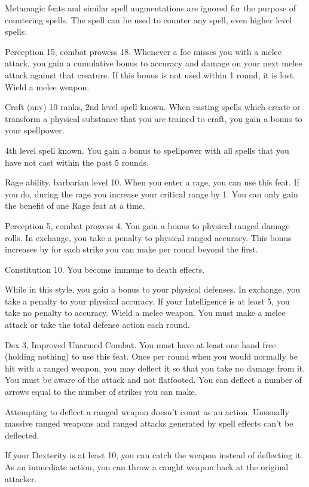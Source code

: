 Metamagic feats and similar spell augmentations are ignored for the purpose of countering spells.
The  spell can be used to counter any spell, even higher level spells.

\featpres Perception 15, combat prowess 18.
\featben Whenever a foe misses you with a melee attack, you gain a cumulative  bonus to accuracy and damage on your next melee attack against that creature.
If this bonus is not used within 1 round, it is lost.
\stylereq Wield a melee weapon.

\featpres Craft (any) 10 ranks, 2nd level spell known.
\featben When casting spells which create or transform a physical substance that you are trained to craft, you gain a  bonus to your spellpower.

\featpre 4th level spell known.
\featben You gain a  bonus to spellpower with all spells that you have not cast within the past 5 rounds.

\featpre Rage ability, barbarian level 10.
\featben When you enter a rage, you can use this feat. If you do, during the rage you increase your critical range by 1.
 You can only gain the benefit of one Rage feat at a time.

\featpres Perception 5, combat prowess 4.
\featben You gain a  bonus to physical ranged damage rolls.
In exchange, you take a  penalty to physical ranged accuracy.
This bonus increases by  for each strike you can make per round beyond the first.

\featpre Constitution 10.
\featben You become immune to death effects.

\featben While in this style, you gain a  bonus to your physical defenses.
In exchange, you take a  penalty to your physical accuracy.
If your Intelligence is at least 5, you take no penalty to accuracy.
\stylereq Wield a melee weapon. You must make a melee attack or take the total defense action each round.

\featpres Dex 3, Improved Unarmed Combat.
\featben You must have at least one hand free (holding nothing) to use this feat.
Once per round when you would normally be hit with a ranged weapon, you may deflect it so that you take no damage from it.
You must be aware of the attack and not flatfooted.
You can deflect a number of arrows equal to the number of strikes you can make.
\par Attempting to deflect a ranged weapon doesn't count as an action.
Unusually massive ranged weapons and ranged attacks generated by spell effects can't be deflected.
\par If your Dexterity is at least 10, you can catch the weapon instead of deflecting it.
As an immediate action, you can throw a caught weapon back at the original attacker.

